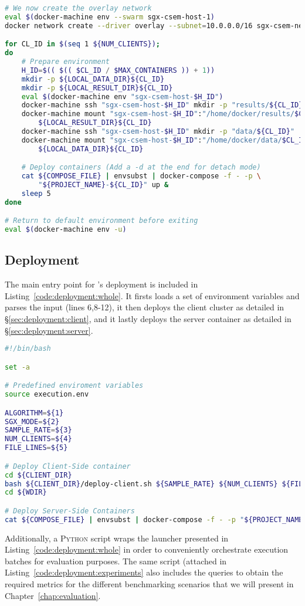 \begin{lstlisting}[language=sh,caption={Client Cluster Deployment Script.},label=code:deploy-client]
# We now create the overlay network
eval $(docker-machine env --swarm sgx-csem-host-1)
docker network create --driver overlay --subnet=10.0.0.0/16 sgx-csem-net

for CL_ID in $(seq 1 ${NUM_CLIENTS});
do
    # Prepare environment
    H_ID=$(( $(( $CL_ID / $MAX_CONTAINERS )) + 1))
    mkdir -p ${LOCAL_DATA_DIR}${CL_ID}
    mkdir -p ${LOCAL_RESULT_DIR}${CL_ID}
    eval $(docker-machine env "sgx-csem-host-$H_ID")
    docker-machine ssh "sgx-csem-host-$H_ID" mkdir -p "results/${CL_ID}"
    docker-machine mount "sgx-csem-host-$H_ID":"/home/docker/results/$CL_ID" \
        ${LOCAL_RESULT_DIR}${CL_ID}
    docker-machine ssh "sgx-csem-host-$H_ID" mkdir -p "data/${CL_ID}"
    docker-machine mount "sgx-csem-host-$H_ID":"/home/docker/data/$CL_ID" \
        ${LOCAL_DATA_DIR}${CL_ID}

    # Deploy containers (Add a -d at the end for detach mode)
    cat ${COMPOSE_FILE} | envsubst | docker-compose -f - -p \
        "${PROJECT_NAME}-${CL_ID}" up &
    sleep 5
done

# Return to default environment before exiting
eval $(docker-machine env -u)
\end{lstlisting}

\subsection{\projName Deployment} \label{sec:deployment:all}

The main entry point for \projName's deployment is included in Listing~\ref{code:deployment:whole}.
It firsts loads a set of environment variables and parses the input (lines 6,8-12), it then deploys the client cluster as detailed in \S\ref{sec:deployment:client}, and it lastly deploys the server container as detailed in \S\ref{sec:deployment:server}.
\begin{lstlisting}[language=sh,caption={Main entry point for a single \projName execution.},label=code:deployment:whole]
#!/bin/bash

set -a

# Predefined enviroment variables
source execution.env

ALGORITHM=${1}
SGX_MODE=${2}
SAMPLE_RATE=${3}
NUM_CLIENTS=${4}
FILE_LINES=${5}

# Deploy Client-Side container
cd ${CLIENT_DIR}
bash ${CLIENT_DIR}/deploy-client.sh ${SAMPLE_RATE} ${NUM_CLIENTS} ${FILE_LINES}
cd ${WDIR}

# Deploy Server-Side Containers
cat ${COMPOSE_FILE} | envsubst | docker-compose -f - -p "${PROJECT_NAME}" up &
\end{lstlisting}

Additionally, a \textsc{Python} script wraps the launcher presented in Listing~\ref{code:deployment:whole} in order to conveniently orchestrate execution batches for evaluation purposes.
The same script (attached in Listing~\ref{code:deployment:experiments} also includes the queries to obtain the required metrics for the different benchmarking scenarios that we will present in Chapter~\ref{chap:evaluation}.
